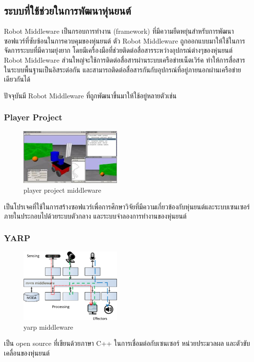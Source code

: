 \subsection{ระบบที่ใช้ช่วยในการพัฒนาหุ่นยนต์}
Robot Middleware เป็นกรอบการทำงาน (framework) ที่มีความยืดหยุ่นสำหรับการพัฒนาซอฟแวร์ที่ซับซ้อนในการควบคุมของหุ่นยนต์
ตัว Robot Middleware ถูกออกแบบมาให้ใช้ในการจัดการระบบที่มีความยุ่งยาก โดยมีเครื่องมือที่ช่วยติดต่อสื่อสารระหว่างอุปกรณ์ต่างๆของหุ่นยนต์ 
Robot Middleware ส่วนใหญ่จะใช้การติดต่อสื่อสารผ่านระบบเครือข่ายเน็ตเวิร์ค ทำให้การสื่อสารในระบบพื้นฐานเป็นอิสระต่อกัน 
และสามารถติดต่อสื่อสารกันกับอุปกรณ์ที่อยู่ภายนอกผ่านเครือข่ายเดียวกันได้

ปัจจุบันมี Robot Middleware ที่ถูกพัฒนาขึ้นมาให้ใช้อยู่หลายตัวเช่น

\subsubsection*{Player Project}
\begin{figure}[!ht]
    \centering
    \includegraphics[width=0.45\textwidth]{chapter2/images/mdw_playerproject.jpeg}
    \caption{player project middleware}
    \label{fig:mdw_playerproject}
\end{figure}
เป็นโปรเจคที่ใช้ในการสร้างซอฟแวร์เพื่อการศึกษาวิจัยที่มีความเกี่ยวข้องกับหุ่นยนต์และระบบเซนเซอร์
ภายในประกอบไปด้วยระบบตัวกลาง และระบบจำลองการทำงานของหุ่นยนต์

\subsubsection*{YARP}
\begin{figure}[!ht]
    \centering
    \includegraphics[width=0.45\textwidth]{chapter2/images/mdw_yarp.png}
    \caption{yarp middleware}
    \label{fig:mdw_yarp}
\end{figure}
เป็น open source ที่เขียนด้วยภาษา C++ ในการเชื่อมต่อกับเซนเซอร์ หน่วยประมวลผล และตัวขับเคลื่อนของหุ่นยนต์

